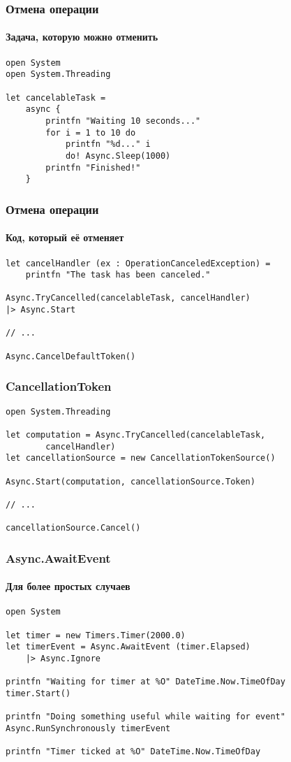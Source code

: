 \documentclass[xetex,mathserif,serif]{beamer}
\begin{document}
	\begin{frame}[fragile]
		\frametitle{Отмена операции}
		\framesubtitle{Задача, которую можно отменить}
		\begin{verbatim}
open System
open System.Threading

let cancelableTask =
    async {
        printfn "Waiting 10 seconds..."
        for i = 1 to 10 do
            printfn "%d..." i
            do! Async.Sleep(1000)
        printfn "Finished!"
    }
		\end{verbatim}
\end{frame}

	\begin{frame}[fragile]
		\frametitle{Отмена операции}
		\framesubtitle{Код, который её отменяет}
		\begin{verbatim}
let cancelHandler (ex : OperationCanceledException) =
    printfn "The task has been canceled."

Async.TryCancelled(cancelableTask, cancelHandler)
|> Async.Start

// ...

Async.CancelDefaultToken()
		\end{verbatim}
\end{frame}

	\begin{frame}[fragile]
		\frametitle{CancellationToken}
		\begin{verbatim}
open System.Threading

let computation = Async.TryCancelled(cancelableTask, 
        cancelHandler)
let cancellationSource = new CancellationTokenSource()

Async.Start(computation, cancellationSource.Token)

// ...

cancellationSource.Cancel()
		\end{verbatim}
\end{frame}

	\begin{frame}[fragile]
		\frametitle{Async.AwaitEvent}
		\framesubtitle{Для более простых случаев}
		\begin{verbatim}
open System

let timer = new Timers.Timer(2000.0)
let timerEvent = Async.AwaitEvent (timer.Elapsed) 
    |> Async.Ignore

printfn "Waiting for timer at %O" DateTime.Now.TimeOfDay
timer.Start()

printfn "Doing something useful while waiting for event"
Async.RunSynchronously timerEvent

printfn "Timer ticked at %O" DateTime.Now.TimeOfDay
		\end{verbatim}
\end{frame}
\end{document}

